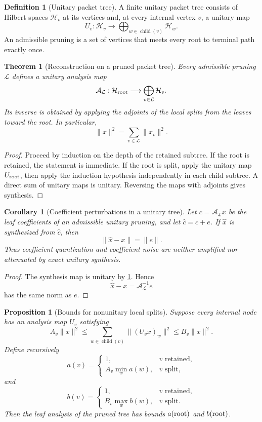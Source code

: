 \documentclass{aomart}
\newtheorem{theorem}{Theorem}[section]
\newtheorem{proposition}[proposition]{Proposition}
\newtheorem{corollary}[corollary]{Corollary}
\theoremstyle{definition}
\newtheorem{definition}[definition]{Definition}
\theoremstyle{remark}
\newcommand{\Acal}{\mathcal A}
\newcommand{\Hcal}{\mathcal H}
\newcommand{\Lcal}{\mathcal L}
\begin{document}
\begin{definition}[Unitary packet tree]\label{def:unitary_packet_tree}
A finite unitary packet tree consists of Hilbert spaces \(\Hcal_v\) at its vertices and, at every internal vertex \(v\), a unitary map
\[
U_v:\Hcal_v\longrightarrow\bigoplus_{w\in\operatorname{child}(v)}\Hcal_w.
\]
An admissible pruning is a set of vertices that meets every root to terminal path exactly once.
\end{definition}

\begin{theorem}[Reconstruction on a pruned packet tree]\label{thm:pruned_packet_tree}
Every admissible pruning \(\Lcal\) defines a unitary analysis map
\[
\Acal_{\Lcal}:\Hcal_{\rm root}
\longrightarrow
\bigoplus_{v\in\Lcal}\Hcal_v.
\]
Its inverse is obtained by applying the adjoints of the local splits from the leaves toward the root. In particular,
\[
\|x\|^2
=
\sum_{v\in\Lcal}\|x_v\|^2.
\]
\end{theorem}

\begin{proof}
Proceed by induction on the depth of the retained subtree. If the root is retained, the statement is immediate. If the root is split, apply the unitary map \(U_{\rm root}\), then apply the induction hypothesis independently in each child subtree. A direct sum of unitary maps is unitary. Reversing the maps with adjoints gives synthesis.
\end{proof}

\begin{corollary}[Coefficient perturbations in a unitary tree]\label{cor:unitary_tree_noise}
Let \(c=\Acal_{\Lcal}x\) be the leaf coefficients of an admissible unitary pruning, and let \(\widehat c=c+e\). If \(\widehat x\) is synthesized from \(\widehat c\), then
\[
\|\widehat x-x\|=\|e\|.
\]
Thus coefficient quantization and coefficient noise are neither amplified nor attenuated by exact unitary synthesis.
\end{corollary}

\begin{proof}
The synthesis map is unitary by \cref{thm:pruned_packet_tree}. Hence
\[
\widehat x-x
=\Acal_{\Lcal}^{-1}e
\]
has the same norm as \(e\).
\end{proof}

\begin{proposition}[Bounds for nonunitary local splits]\label{prop:nonunitary_tree_bounds}
Suppose every internal node has an analysis map \(U_v\) satisfying
\[
A_v\|x\|^2
\leq
\sum_{w\in\operatorname{child}(v)}\|(U_vx)_w\|^2
\leq
B_v\|x\|^2.
\]
Define recursively
\[
a(v)=
\begin{cases}
1,&v\text{ retained},\\
A_v\min_w a(w),&v\text{ split},
\end{cases}
\]
and
\[
b(v)=
\begin{cases}
1,&v\text{ retained},\\
B_v\max_w b(w),&v\text{ split}.
\end{cases}
\]
Then the leaf analysis of the pruned tree has bounds \(a({\rm root})\) and \(b({\rm root})\).
\end{proposition}
\end{document}
